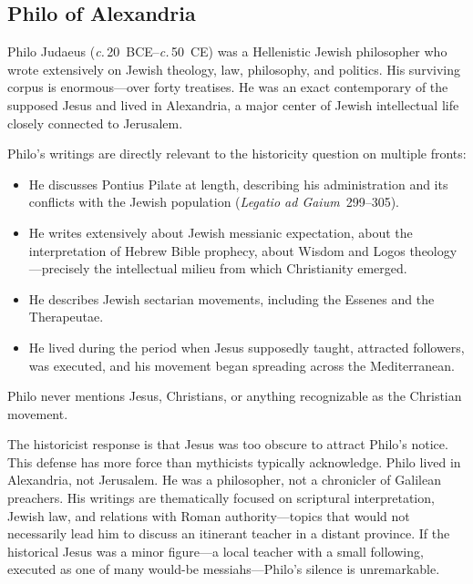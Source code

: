 \documentclass[12pt,oneside]{article}
\newcommand{\circa}{\textit{c.}\,}
\begin{document}
\subsection{Philo of Alexandria}
\label{sec:silence:philo}

Philo Judaeus (\circa 20~BCE--\circa 50~CE) was a Hellenistic Jewish
philosopher who wrote extensively on Jewish theology, law, philosophy,
and politics.  His surviving corpus is enormous---over forty treatises.
He was an exact contemporary of the supposed Jesus and lived in
Alexandria, a major center of Jewish intellectual life closely connected
to Jerusalem.

Philo's writings are directly relevant to the historicity question on
multiple fronts:

\begin{itemize}[leftmargin=2em]
\item He discusses Pontius Pilate at length, describing his
administration and its conflicts with the Jewish population
(\textit{Legatio ad Gaium}~299--305).

\item He writes extensively about Jewish messianic expectation, about
the interpretation of Hebrew Bible prophecy, about Wisdom and Logos
theology---precisely the intellectual milieu from which Christianity
emerged.

\item He describes Jewish sectarian movements, including the Essenes
and the Therapeutae.

\item He lived during the period when Jesus supposedly taught,
attracted followers, was executed, and his movement began spreading
across the Mediterranean.
\end{itemize}

Philo never mentions Jesus, Christians, or anything recognizable as the
Christian movement.

The historicist response is that Jesus was too obscure to attract
Philo's notice.  This defense has more force than mythicists typically
acknowledge.  Philo lived in Alexandria, not Jerusalem.  He was a
philosopher, not a chronicler of Galilean preachers.  His writings
are thematically focused on scriptural interpretation, Jewish law, and
relations with Roman authority---topics that would not necessarily lead
him to discuss an itinerant teacher in a distant province.  If the
historical Jesus was a minor figure---a local teacher with a small
following, executed as one of many would-be messiahs---Philo's silence
is unremarkable.
\end{document}
